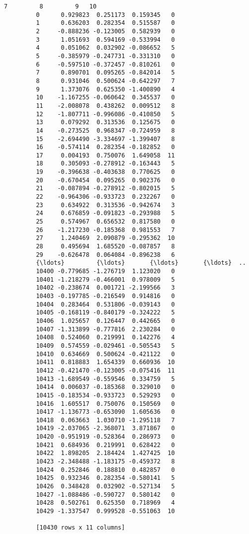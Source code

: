 \documentclass[11pt]{article}
\begin{document}
\begin{Verbatim}[commandchars=\\\{\}]
                      7         8         9   10  
         0      0.929823  0.251173  0.159345   0  
         1      0.636203  0.282354  0.515587   0  
         2     -0.888236 -0.123005  0.582939   0  
         3      1.051693  0.594169 -0.533994   0  
         4      0.051062  0.032902 -0.086652   5  
         5     -0.385979 -0.247731 -0.331310   0  
         6     -0.597510 -0.372457 -0.810261   0  
         7      0.890701  0.095265 -0.842014   5  
         8      0.931046  0.500624 -0.642297   7  
         9      1.373076  0.625350 -1.400890   4  
         10    -1.167255 -0.060642  0.345537   0  
         11    -2.008078  0.438262  0.009512   8  
         12    -1.807711 -0.996086 -0.410850   5  
         13     0.079292  0.313536  0.125675   0  
         14    -0.273525  0.968347 -0.724959   8  
         15    -2.694490 -3.334697 -1.399407   8  
         16    -0.574114  0.282354 -0.182852   0  
         17     0.004193  0.750076  1.649058  11  
         18     0.305093 -0.278912 -0.163443   5  
         19    -0.396638 -0.403638  0.770625   0  
         20    -0.670454  0.095265  0.902376   0  
         21    -0.087894 -0.278912 -0.802015   5  
         22    -0.964306 -0.933723  0.232267   0  
         23     0.634922  0.313536 -0.942674   3  
         24     0.676859 -0.091823 -0.293988   5  
         25     0.574967  0.656532  0.817580   0  
         26    -1.217230 -0.185368  0.981553   7  
         27     1.240469  2.090879 -0.295362  10  
         28     0.495694  1.685520 -0.087857   8  
         29    -0.626478  0.064084 -0.896238   6  
         {\ldots}         {\ldots}       {\ldots}       {\ldots}  ..  
         10400 -0.779685 -1.276719  1.123020   0  
         10401 -1.218279 -0.466001  0.978009   5  
         10402 -0.238674  0.001721 -2.199566   3  
         10403 -0.197785 -0.216549  0.914816   0  
         10404  0.283464  0.531806 -0.039143   0  
         10405 -0.168119 -0.840179 -0.324222   5  
         10406  1.025657  0.126447  0.442665   0  
         10407 -1.313899 -0.777816  2.230284   0  
         10408  0.524060  0.219991  0.142276   4  
         10409  0.574559 -0.029461 -0.505543   5  
         10410  0.634669  0.500624 -0.421122   0  
         10411  0.818883  1.654339  0.660936  10  
         10412 -0.421470 -0.123005 -0.075416  11  
         10413 -1.689549 -0.559546  0.334759   5  
         10414  0.006037 -0.185368  0.329010   0  
         10415 -0.183534 -0.933723  0.529293   0  
         10416  1.605517  0.750076  0.150569   0  
         10417 -1.136773 -0.653090  1.605636   0  
         10418  0.063663  1.030710 -1.295118   7  
         10419 -2.037065 -2.368071  3.871867   0  
         10420 -0.951919 -0.528364  0.286973   0  
         10421  0.684936  0.219991  0.628422   0  
         10422  1.898205  2.184424  1.427425  10  
         10423 -2.348488 -1.183175 -0.459372   8  
         10424  0.252846  0.188810  0.482857   0  
         10425  0.932346  0.282354 -0.580141   5  
         10426  0.348428  0.032902 -0.527134   5  
         10427 -1.088486 -0.590727  0.580142   0  
         10428  0.502761  0.625350  0.718969   4  
         10429 -1.337547  0.999528 -0.551063  10  
         
         [10430 rows x 11 columns]
\end{Verbatim}
\end{document}

